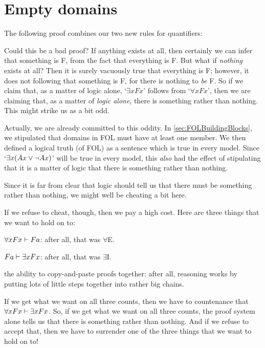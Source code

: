 \section{Empty domains}
The following proof combines our two new rules for quantifiers:
	\begin{fitchproof}
	\end{fitchproof}
Could this be a bad proof? If anything exists at all, then certainly we can infer that something is F, from the fact that everything is F. But what if \emph{nothing} exists at all? Then it is surely vacuously true that everything is F; however, it does not following that something is F, for there is nothing to \emph{be} F. So if we claim that, as a matter of logic alone, `$\exists x Fx$' follows from `$\forall x Fx$', then we are claiming that, as a matter of \emph{logic alone}, there is something rather than nothing. This might strike us as a bit odd.

Actually, we are already committed to this oddity. In \cref{sec:FOLBuildingBlocks}, we stipulated that domains in FOL must have at least one member. We then defined a logical truth (of FOL) as a sentence which is true in every model. Since `$\exists x(Ax\vee\neg Ax)$' will be true in every model, this \emph{also} had the effect of stipulating that it is a matter of logic that there is something rather than nothing.

Since it is far from clear that logic should tell us that there must be something rather than nothing, we might well be cheating a bit here.

If we refuse to cheat, though, then we pay a high cost. Here are three things that we want to hold on to:
	\begin{ebullet}
		\item $\forall x Fx \vdash Fa$: after all, that was $\forall$E.
		\item $Fa \vdash \exists x Fx$: after all, that was $\exists$I.
		\item the ability to copy-and-paste proofs together: after all, reasoning works by putting lots of little steps together into rather big chains.
	\end{ebullet}
If we get what we want on all three counts, then we have to countenance that $\forall xFx \vdash \exists x Fx$. So, if we get what we want on all three counts, the proof system alone tells us that there is something rather than nothing. And if we refuse to accept that, then we have to surrender one of the three things that we want to hold on to!

